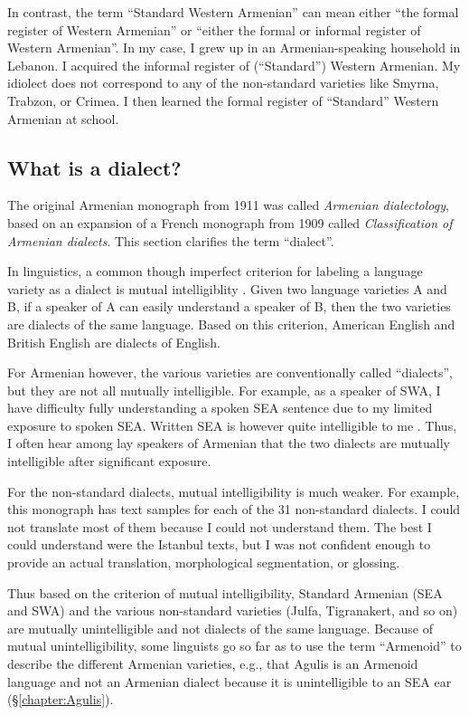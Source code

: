\documentclass[output=paper]{langscibook}
\begin{document}
In contrast, the term “Standard Western Armenian” can mean either “the formal register of Western Armenian” or “either the formal or informal register of Western Armenian”. In my case, I grew up in an Armenian\hyp speaking household in Lebanon. I acquired the informal register of (“Standard”) Western Armenian. My idiolect does not correspond to any of the non-standard varieties like Smyrna, Trabzon, or Crimea. I then learned the formal register of “Standard” Western Armenian at school. 


\subsection{What is a dialect?}\label{sec:HossepIntro:armenian:whatisdialect}
\largerpage
The original Armenian monograph from 1911 was called \textit{Armenian dialectology}, based on an expansion of a French monograph from 1909 called  \textit{Classification of Armenian dialects}. This section clarifies the term ``dialect''.


In linguistics, a common though imperfect criterion for labeling a language variety as a dialect is mutual intelligiblity \citep[3]{ChambersTrudgill-1998-Dialectology}. Given two language varieties A and B, if a speaker of A can easily understand a speaker of B, then the two varieties are dialects of the same language. Based on this criterion, American English and British English are dialects of English. 

For Armenian however, the various varieties are conventionally called ``dialects'', but they are not all mutually intelligible. For example, as a speaker of SWA, I have difficulty fully understanding a spoken SEA sentence due to my limited exposure to spoken SEA. Written SEA is however quite intelligible to me \citep[cf. intelligibility asymmetries discussed by ][197]{DumTragut-2012-AmenTeghHayGaPluricentricArmenian}. Thus, I often hear among lay speakers of Armenian that the two dialects are mutually intelligible after significant exposure.

For the non-standard dialects, mutual intelligibility   is much weaker. For example, this monograph has text samples for each of the 31 non-standard dialects. I could not translate most of them because I could not understand them. The best I could understand were the Istanbul texts, but I was not confident enough to provide an actual translation, morphological segmentation, or glossing. 


Thus based on the criterion of mutual  intelligibility, Standard Armenian (SEA and SWA) and the various non-standard varieties (Julfa, Tigranakert, and so on) are mutually unintelligible and not dialects of the same language. Because of mutual unintelligibility, some linguists go so far as to use the term ``Armenoid'' to describe the different Armenian varieties, e.g., that Agulis is an Armenoid language \citep{Vaux-2008-ArmenianZok} and not an Armenian dialect because it is   unintelligible to an SEA ear (\S\ref{chapter:Agulis}).
\end{document}
